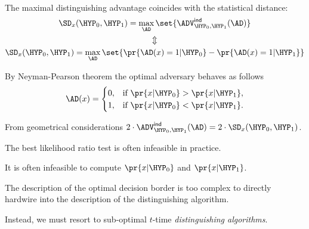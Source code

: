 \documentclass[landscape,footrule]{foils}
\newcommand{\lastline}{\vspace*{-2ex}}
\begin{document}
The maximal distinguishing advantage coincides with the statistical distance:
\begin{gather*}
  \SD_x(\HYP_0,\HYP_1)= \max_{\AD}\set{\smash{\advINDXX{\HYP_0,\HYP_1}{\AD}}}\\
  \Updownarrow\\
  \SD_x(\HYP_0,\HYP_1)=\max_\AD \set{\pr{\AD(x)=1|\HYP_0}-\pr{\AD(x)=1|\HYP_1}}
\end{gather*}




\begin{triangles}
\item By Neyman-Pearson theorem  the optimal adversary behaves as follows
    \begin{align*}
      \AD(x) = 
      \begin{cases}
        0, &\text{if } \pr{x|\HYP_0}>\pr{x|\HYP_1},\\
        1, &\text{if } \pr{x|\HYP_0}<\pr{x|\HYP_1}.
      \end{cases}
    \end{align*}
\item From geometrical considerations $2\cdot\advINDXX{\HYP_0,\HYP_1}{\AD}=2\cdot\SD_x(\HYP_0,\HYP_1)$.
\end{triangles}






The best likelihood ratio test is often infeasible in practice.
\begin{triangles}
  \item It is often infeasible to compute $\pr{x|\HYP_0}$ and $\pr{x|\HYP_1}$.
  \item The description of the optimal decision border is too complex
    to directly hardwire into the description of the distinguishing algorithm.
\end{triangles}

Instead, we must resort to sub-optimal $t$-time \emph{distinguishing algorithms}.
\lastline


\end{document}
